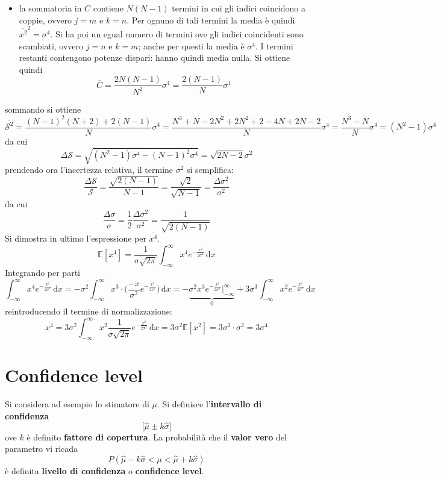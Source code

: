 \documentclass[10pt, oneside]{book}
\newcommand{\integral}[4]{\int_{#1}^{#2} #3 \, \mathrm{d}#4}
\begin{document}
{\begin{itemize}
\[\overline{B} = 0\]
\item la sommatoria in $C$ contiene $N(N-1)$ termini in cui gli indici coincidono a coppie, ovvero $j = m$ e $k = n$. Per ognuno di tali termini la media è quindi $\overline{x^2}^2 = \sigma^4$. Si ha poi un egual numero di termini ove gli indici coincidenti sono scambiati, ovvero $j = n$ e $k = m$; anche per questi la media è $\sigma^4$. I termini restanti contengono potenze dispari: hanno quindi media nulla. Si ottiene quindi
\[\overline{C} = \frac{2N(N-1)}{N^2}\sigma^4 = \frac{2(N-1)}{N}\sigma^4\]
\end{itemize}
sommando si ottiene
\[\overline{\mathcal{S}^2} = \frac{(N-1)^2(N+2) + 2 (N-1)}{N}\sigma^4 = \frac{N^3 + N - 2N^2 + 2N^2 + 2 - 4N + 2N - 2}{N}\sigma^4 = \frac{N^3 - N}{N}\sigma^4 = (N^2 - 1) \sigma^4\]
da cui
\[\Delta \mathcal{S} = \sqrt{(N^2-1)\sigma^4 - (N-1)^2 \sigma^4} = \sqrt{2N - 2} \sigma^2\]
prendendo ora l'incertezza relativa, il termine $\sigma^2$ si semplifica:
\[\frac{\Delta \mathcal{S}}{\mathcal{S}} = \frac{\sqrt{2(N-1)}}{N-1} = \frac{\sqrt{2}}{\sqrt{N-1}} = \frac{\Delta \sigma^2}{\sigma^2}\]
da cui
\[\frac{\Delta \sigma }{\sigma} = \frac{1}{2} \frac{\Delta \sigma^2}{\sigma^2} = \frac{1}{\sqrt{2(N-1)}}\]
Si dimostra in ultimo l'espressione per $\overline{x^4}$.
\[\mathbb{E}[x^4] = \frac{1}{\sigma \sqrt{2\pi}}\integral{-\infty}{\infty}{x^4 e^{\displaystyle - \frac{x^2}{2\sigma^2}}}{x}\]
Integrando per parti
\[\integral{-\infty}{\infty}{x^4 e^{\displaystyle - \frac{x^2}{2\sigma^2}}}{x} = - \sigma^2 \integral{-\infty}{\infty}{x^3 \cdot \big( \frac{-x}{\sigma^2} e^{\displaystyle - \frac{x^2}{2\sigma^2}}\big)}{x} = - \underbrace{\sigma^2 x^3 e^{\displaystyle - \frac{x^2}{2\sigma^2}} \bigg|_{-\infty}^{\infty}}_{0} + 3 \sigma^3 \integral{-\infty}{\infty}{x^2 e^{\displaystyle - \frac{x^2}{2\sigma^2}}}{x}\]
reintroducendo il termine di normalizzazione:
\[\overline{x^4} = 3 \sigma^2 \integral{-\infty}{\infty}{x^2  \frac{1}{\sigma \sqrt{2\pi}} e^{\displaystyle - \frac{x^2}{2\sigma^2}}}{x} = 3 \sigma^2 \mathbb{E}[x^2] = 3 \sigma^2 \cdot \sigma^2 = 3 \sigma^4\]
}

\section{Confidence level}
Si considera ad esempio lo stimatore di $\mu$. Si definisce l'\textbf{intervallo di confidenza} 
\[\big[\hat{\mu} \pm k \hat{\sigma}\big]\]
ove $k$ è definito \textbf{fattore di copertura}. La probabilità che il \textbf{valor vero} del parametro vi ricada
\[P(\hat{\mu} - k \hat{\sigma} < \mu < \hat{\mu} + k \hat{\sigma})\]
è definita \textbf{livello di confidenza} o \textbf{confidence level}.
\end{document}

